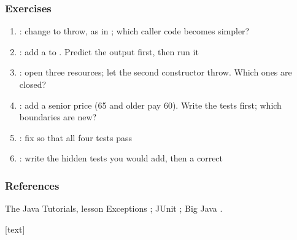 \documentclass[aspectratio=169,10pt,compress]{beamer}
\begin{document}
\begin{frame}[t,fragile] \frametitle{Exercises}
	\begin{enumerate}\small
		\item {}: change  to throw, as in ; which caller code becomes simpler?
		\item {}: add a  to . Predict the output first, then run it
		\item {}: open three resources; let the second constructor throw. Which ones are closed?
		\item {}: add a senior price (65 and older pay 60). Write the tests first; which boundaries are new?
		\item {}: fix  so that all four tests pass
		\item {}: write the hidden tests you would add, then a correct 
	\end{enumerate}
\end{frame}




\begin{frame}[t,fragile] \frametitle{References}
	\small The Java Tutorials, lesson Exceptions \cite{TheJavaTutorials}; JUnit \cite{homeJunit}; Big Java \cite{horstmann2016big}.

	\vspace{1em}
	[text]
	
	\tiny
\end{frame}




\begin{frame}[t,fragile]
	\begin{center}
		\vspace{4cm}
	\end{center}
\end{frame}
\end{document}
